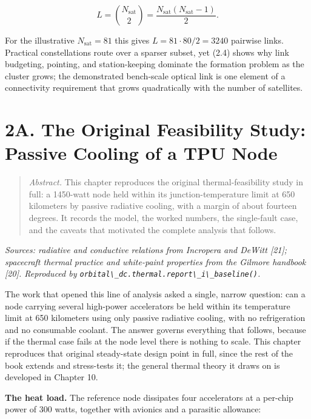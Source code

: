 \documentclass[
  11pt,
  openany,
  oneside]{book}
\newcommand{\passthrough}[1]{#1}
\begin{document}
\begin{equation}
L = \binom{N_{\mathrm{sat}}}{2} = \frac{N_{\mathrm{sat}}(N_{\mathrm{sat}}-1)}{2}. \tag{2.4}
\end{equation}

For the illustrative \(N_{\mathrm{sat}}=81\) this gives
\(L = 81\cdot 80/2 = 3240\) pairwise links. Practical constellations
route over a sparser subset, yet (2.4) shows why link budgeting,
pointing, and station-keeping dominate the formation problem as the
cluster grows; the demonstrated bench-scale optical link is one element
of a connectivity requirement that grows quadratically with the number
of satellites.

\chapter{2A. The Original Feasibility Study: Passive Cooling of a TPU
Node}\label{a.-the-original-feasibility-study-passive-cooling-of-a-tpu-node}

\begin{quote}
\emph{Abstract.} This chapter reproduces the original
thermal-feasibility study in full: a 1450-watt node held within its
junction-temperature limit at 650 kilometers by passive radiative
cooling, with a margin of about fourteen degrees. It records the model,
the worked numbers, the single-fault case, and the caveats that
motivated the complete analysis that follows.
\end{quote}

\emph{Sources: radiative and conductive relations from Incropera and
DeWitt {[}21{]}; spacecraft thermal practice and white-paint properties
from the Gilmore handbook {[}20{]}. Reproduced by
\passthrough{\lstinline!orbital\_dc.thermal.report\_i\_baseline()!}.}

The work that opened this line of analysis asked a single, narrow
question: can a node carrying several high-power accelerators be held
within its temperature limit at 650 kilometers using only passive
radiative cooling, with no refrigeration and no consumable coolant. The
answer governs everything that follows, because if the thermal case
fails at the node level there is nothing to scale. This chapter
reproduces that original steady-state design point in full, since the
rest of the book extends and stress-tests it; the general thermal theory
it draws on is developed in Chapter 10.

\textbf{The heat load.} The reference node dissipates four accelerators
at a per-chip power of 300 watts, together with avionics and a parasitic
allowance:
\end{document}
